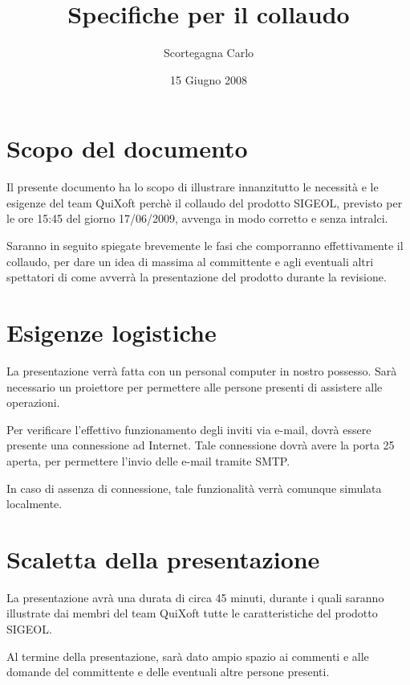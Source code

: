 \documentclass[11pt,a4paper]{article}
\title{Specifiche per il collaudo}
\author{Scortegagna Carlo}
\date{15 Giugno 2008}
\begin{document}
\maketitle
\section{Scopo del documento}
Il presente documento ha lo scopo di illustrare innanzitutto le necessità e le esigenze del team QuiXoft perchè il collaudo del prodotto SIGEOL, previsto per le ore 15:45 del giorno 17/06/2009, avvenga in modo corretto e senza intralci.

Saranno in seguito spiegate brevemente le fasi che comporranno effettivamente il collaudo, per dare un idea di massima al committente e agli eventuali altri spettatori di come avverrà la presentazione del prodotto durante la revisione.
\bigskip
\section{Esigenze logistiche}
La presentazione verrà fatta con un personal computer in nostro possesso. Sarà necessario un proiettore per permettere alle persone presenti di assistere alle operazioni.

Per verificare l'effettivo funzionamento degli inviti via e-mail, dovrà essere presente una connessione ad Internet.
Tale connessione dovrà avere la porta 25 aperta, per permettere l'invio delle e-mail tramite SMTP.

In caso di assenza di connessione, tale funzionalità verrà comunque simu\-lata localmente.
\bigskip
\section{Scaletta della presentazione}
La presentazione avrà una durata di circa 45 minuti, durante i quali saranno illustrate dai membri del team QuiXoft tutte le caratteristiche del prodotto SIGEOL.

Al termine della presentazione, sarà dato ampio spazio ai commenti e alle domande del committente e delle eventuali altre persone presenti.
\end{document}
